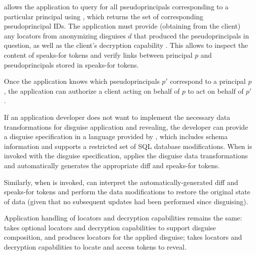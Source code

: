 \sys allows the application to query for all pseudoprincipals corresponding to a particular
principal using , which returns the set of corresponding pseudoprincipal
IDs. The application must provide (obtaining from the client) any locators  from
anonymizing disguises $d$ that produced the pseudoprincipals in question, as well as the client's
decryption capability . This allows \sys to inspect the content of speaks-for tokens and
verify links between principal $p$ and pseudoprincipals stored in speaks-for tokens.

Once the application knows which pseudoprincipals $p'$ correspond to a principal $p$, the application can
authorize a client acting on behalf of $p$ to act on behalf of $p'$.

If an application developer does not want to implement the necessary data transformations for disguise
application and revealing, the developer can provide a disguise specification in a language provided
by \sys, which includes schema information and supports a restricted set of SQL database
modifications. When  is invoked with the disguise specification, \sys applies the
disguise data transformations and automatically generates the appropriate diff and speaks-for tokens.

Similarly, when  is invoked, \sys can interpret the automatically-generated diff and
speaks-for tokens and perform the data modifications to restore the original state of data (given
that no subsequent updates had been performed since disguising).

Application handling of locators and decryption capabilities remains the same: 
takes optional locators and decryption capabilities to support disguise composition, and produces
locators for the applied disguise;  takes locators and decryption capabilities to
locate and access tokens to reveal.


